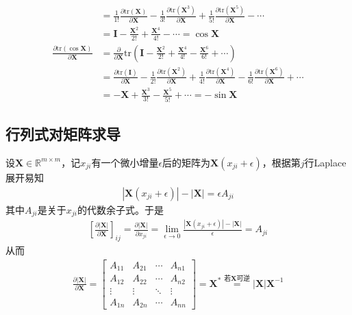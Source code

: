 \documentclass{ctexart}
\theoremstyle{definition}
\def \Iv {\mathbf{I}}
\def \Xv {\mathbf{X}}
\def \Rbb {\mathbb{R}}
\def \tr {\mathrm{tr}}
\begin{document}
\begin{itemize}
\begin{align*}
                                                          & = \frac{1}{1!} \frac{\partial \tr (\Xv)}{\partial \Xv} - \frac{1}{3!} \frac{\partial \tr (\Xv^3)}{\partial \Xv} + \frac{1}{5!} \frac{\partial \tr (\Xv^5)}{\partial \Xv} - \cdots                                             \\
                                                          & = \Iv - \frac{\Xv^2}{2!} + \frac{\Xv^4}{4!} - \cdots = \cos \Xv                                                                                                                                                               \\
              \frac{\partial \tr(\cos \Xv)}{\partial \Xv} & = \frac{\partial }{\partial \Xv} \tr \left( \Iv - \frac{\Xv^2}{2!} + \frac{\Xv^4}{4!} - \frac{\Xv^6}{6!} + \cdots \right)                                                                                                     \\
                                                          & = \frac{\partial \tr (\Iv)}{\partial \Xv} - \frac{1}{2!} \frac{\partial \tr (\Xv^2)}{\partial \Xv} + \frac{1}{4!} \frac{\partial \tr (\Xv^4)}{\partial \Xv} - \frac{1}{6!} \frac{\partial \tr (\Xv^6)}{\partial \Xv} + \cdots \\
                                                          & = - \Xv + \frac{\Xv^3}{3!} - \frac{\Xv^5}{5!} + \cdots = - \sin \Xv
          \end{align*}
\end{itemize}

\subsection{行列式对矩阵求导}

设$\Xv \in \Rbb^{m \times m}$，记$x_{ji}$有一个微小增量$\epsilon$后的矩阵为$\Xv(x_{ji} + \epsilon)$，根据第$j$行Laplace展开易知
\begin{align*}
    |\Xv(x_{ji} + \epsilon)| - |\Xv| = \epsilon A_{ji}
\end{align*}
其中$A_{ji}$是关于$x_{ji}$的代数余子式。于是
\begin{align*}
    \left[ \frac{\partial |\Xv|}{\partial \Xv} \right]_{ij} = \frac{\partial |\Xv|}{\partial x_{ji}} = \lim_{\epsilon \rightarrow 0} \frac{|\Xv(x_{ji} + \epsilon)| - |\Xv|}{\epsilon} = A_{ji}
\end{align*}
从而
\begin{align*}
    \frac{\partial |\Xv|}{\partial \Xv} = \begin{bmatrix}
        A_{11} & A_{21} & \cdots & A_{n1} \\
        A_{12} & A_{22} & \cdots & A_{n2} \\
        \vdots & \vdots & \ddots & \vdots \\
        A_{1n} & A_{2n} & \cdots & A_{nn}
    \end{bmatrix} = \Xv^* \overset{\text{若}\Xv\text{可逆}}{=} |\Xv| \Xv^{-1}
\end{align*}
\end{document}
